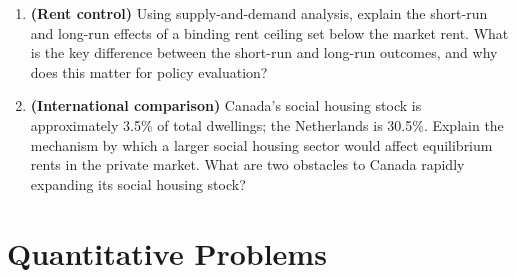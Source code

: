 \begin{enumerate}
\item \textbf{(Rent control)} Using supply-and-demand analysis, explain
the short-run and long-run effects of a binding rent ceiling set below
the market rent. What is the key difference between the short-run and
long-run outcomes, and why does this matter for policy evaluation?

\item \textbf{(International comparison)} Canada's social housing stock
is approximately 3.5\% of total dwellings; the Netherlands is 30.5\%.
Explain the mechanism by which a larger social housing sector would
affect equilibrium rents in the private market. What are two obstacles
to Canada rapidly expanding its social housing stock?

\end{enumerate}

\section*{Quantitative Problems}


